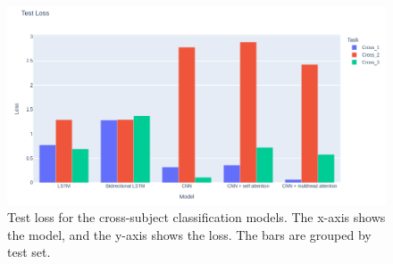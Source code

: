 \documentclass[conference]{IEEEtran}
\begin{document}
\begin{figure}[t]
    \centering
    \includegraphics[width=\textwidth]{figures/test_loss_bars.png}
    \caption{Test loss for the cross-subject classification models. The x-axis shows the model, and the y-axis shows the loss. The bars are grouped by test set.}
    \label{fig:test_loss_bars}
\end{figure}
\end{document}
